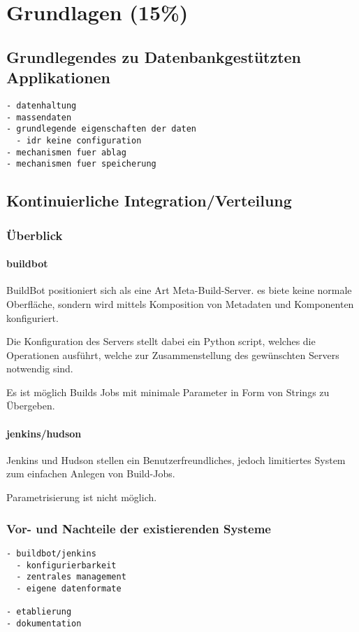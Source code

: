 \chapter{Grundlagen (15\%)}

\section{Grundlegendes zu Datenbankgest\"utzten Applikationen}

\begin{verbatim}
- datenhaltung
- massendaten
- grundlegende eigenschaften der daten
  - idr keine configuration
- mechanismen fuer ablag
- mechanismen fuer speicherung
\end{verbatim}

\section{Kontinuierliche Integration/Verteilung}

\subsection{Überblick}

\subsubsection{buildbot}

BuildBot positioniert sich als eine Art Meta-Build-Server.
es biete keine normale Oberfläche, sondern wird mittels
Komposition von Metadaten und Komponenten konfiguriert.

Die Konfiguration des Servers stellt dabei ein Python script,
welches die Operationen ausführt, welche zur Zusammenstellung des gewünschten Servers notwendig sind.

Es ist möglich Builds Jobs mit minimale Parameter in Form von Strings zu Übergeben.

\subsubsection{jenkins/hudson}

Jenkins und Hudson stellen ein Benutzerfreundliches,
jedoch limitiertes System zum einfachen Anlegen von Build-Jobs.

Parametrisierung ist nicht möglich.

\subsection{Vor- und Nachteile der existierenden Systeme}

\begin{verbatim}
- buildbot/jenkins
  - konfigurierbarkeit
  - zentrales management
  - eigene datenformate

- etablierung
- dokumentation
\end{verbatim}
